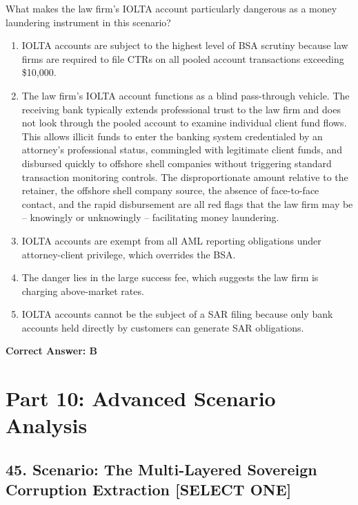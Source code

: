 \documentclass[11pt,a4paper]{article}
\begin{document}
	What makes the law firm's IOLTA account particularly dangerous as a money laundering instrument in this scenario?
	
	\begin{enumerate}[label=\Alph*.]
		\item IOLTA accounts are subject to the highest level of BSA scrutiny because law firms are required to file CTRs on all pooled account transactions exceeding \$10,000.
		\item The law firm's IOLTA account functions as a blind pass-through vehicle. The receiving bank typically extends professional trust to the law firm and does not look through the pooled account to examine individual client fund flows. This allows illicit funds to enter the banking system credentialed by an attorney's professional status, commingled with legitimate client funds, and disbursed quickly to offshore shell companies without triggering standard transaction monitoring controls. The disproportionate amount relative to the retainer, the offshore shell company source, the absence of face-to-face contact, and the rapid disbursement are all red flags that the law firm may be -- knowingly or unknowingly -- facilitating money laundering.
		\item IOLTA accounts are exempt from all AML reporting obligations under attorney-client privilege, which overrides the BSA.
		\item The danger lies in the large success fee, which suggests the law firm is charging above-market rates.
		\item IOLTA accounts cannot be the subject of a SAR filing because only bank accounts held directly by customers can generate SAR obligations.
	\end{enumerate}
	\textbf{Correct Answer: B}
	
	\section{Part 10: Advanced Scenario Analysis}
	
	\subsection{45. Scenario: The Multi-Layered Sovereign Corruption Extraction \textnormal{[SELECT ONE]}}
	
\end{document}
